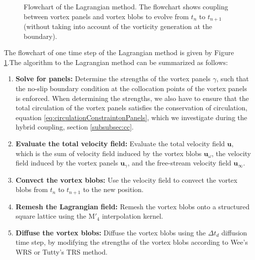 	\begin{figure}[!h]
		\centering
		\caption{Flowchart of the Lagrangian method. The flowchart shows coupling between vortex panels and vortex blobs to evolve from $t_n$ to $t_{n+1}$ (without taking into account of the vorticity generation at the boundary).}
		\label{fig:flowchart_lagrangian}
	\end{figure}	
	
The flowchart of one time step of the Lagrangian method is given by Figure \ref{fig:flowchart_lagrangian}.The algorithm to the Lagrangian method can be summarized as follows:
	\begin{enumerate}
	\item \textbf{Solve for panels:} Determine the strengths of the vortex panels $\gamma$, such that the no-slip boundary condition at the collocation points of the vortex panels is enforced. When determining the strengths, we also have to ensure that the total circulation of the vortex panels satisfies the conservation of circulation, equation \ref{eq:circulationConstraintonPanels}, which we investigate during the hybrid coupling, section \ref{subsubsec:cc}.
	\item \textbf{Evaluate the total velocity field:} Evaluate the total velocity field $\mathbf{u}$, which is the sum of velocity field induced by the vortex blobs $\mathbf{u}_{\omega}$, the velocity field induced by the vortex panels $\mathbf{u}_{\gamma}$, and the free-stream velocity field $\mathbf{u}_{\infty}$. 
	\item \textbf{Convect the vortex blobs:} Use the velocity field to convect the vortex blobs from $t_n$ to $t_{n+1}$ to the new position.
	\item \textbf{Remesh the Lagrangian field:} Remesh the vortex blobs onto a structured square lattice using the $\mathrm{M}'_4$ interpolation kernel.
	\item \textbf{Diffuse the vortex blobs:} Diffuse the vortex blobs using the $\Delta t_d$ diffusion time step, by modifying the strengths of the vortex blobs according to Wee's WRS or Tutty's TRS method.
	\end{enumerate}

